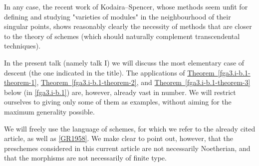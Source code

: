   In any case, the recent work of Kodaira–Spencer, whose methods seem unfit for defining and studying "varieties of modules" in the neighbourhood of their singular points, shows reasonably clearly the necessity of methods that are closer to the theory of schemes (which should naturally complement transcendental techniques).\par{}In the present talk (namely talk I) we will discuss the most elementary case of descent (the one indicated in the title).
  The applications of \hyperref[fga3.i-b.1-theorem-1]{Theorem~\ref*{fga3.i-b.1-theorem-1}}, \hyperref[fga3.i-b.1-theorem-2]{Theorem~\ref*{fga3.i-b.1-theorem-2}}, and \hyperref[fga3.i-b.1-theorem-3]{Theorem~\ref*{fga3.i-b.1-theorem-3}} below (in \cref{fga3.i-b.1}) are, however, already vast in number.
  We will restrict ourselves to giving only some of them as examples, without aiming for the maximum generality possible.\par{}We will freely use the language of schemes, for which we refer to the already cited article, as well as \hyperref[GR1958]{[GR1958]}.
  We make clear to point out, however, that the preschemes considered in this current article are not necessarily Noetherian, and that the morphisms are not necessarily of finite type.
  
